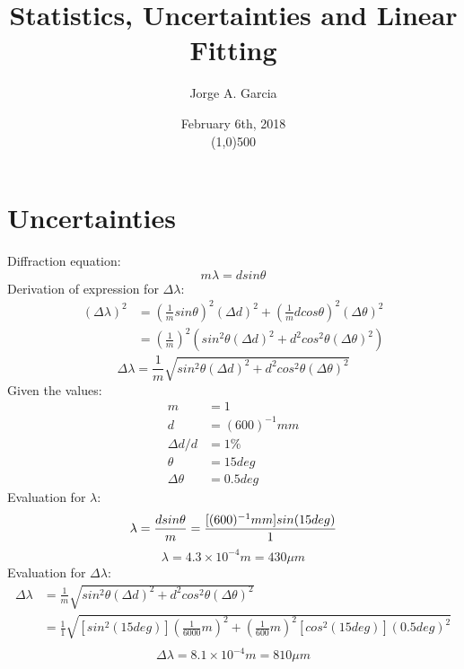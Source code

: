 \documentclass[twocolumn]{article}
\title{Statistics, Uncertainties and Linear Fitting}
\author{Jorge A. Garcia}
\date{February 6th, 2018\\\line(1,0){500}}
\begin{document}
 \maketitle
 
 \section{Uncertainties}
 
 Diffraction equation:
 \begin{equation*}
  m\lambda = dsin\theta
 \end{equation*}
 Derivation of expression for $\Delta\lambda$:
 \begin{align*}
  (\Delta\lambda)^2 &= (\frac{1}{m} sin\theta)^2 (\Delta d)^2 + (\frac{1}{m} dcos\theta)^2 (\Delta\theta)^2 \\
  &= (\frac{1}{m})^2 (sin^2\theta (\Delta d)^2 + d^2 cos^2\theta (\Delta\theta)^2)
 \end{align*}
 \begin{equation*}
  \boxed{\Delta\lambda = \frac{1}{m} \sqrt{ sin^2\theta (\Delta d)^2 + d^2 cos^2\theta (\Delta\theta)^2 }}
 \end{equation*}
 Given the values:
 \begin{align*}
  m &= 1 \\
  d &= (600)^{-1} mm \\
  \Delta d/d &= 1\% \\
  \theta &= 15 deg \\
  \Delta\theta &= 0.5 deg
 \end{align*}
 Evaluation for $\lambda$:
 \begin{equation*}
  \lambda = \frac{dsin\theta}{m} = \frac{ [(600)^{-1} mm] sin (15 deg)}{1} \\
 \end{equation*}
  \begin{equation*}
  \boxed{\lambda = 4.3 \times 10^{-4} m = 430 \mu m}
 \end{equation*}
 Evaluation for $\Delta\lambda$:
 \begin{align*}
  \Delta\lambda &= \frac{1}{m} \sqrt{ sin^2\theta (\Delta d)^2 + d^2 cos^2\theta (\Delta\theta)^2} \\
  &= \frac{1}{1} \sqrt{ [sin^2(15 deg)] (\frac{1}{6000}m)^2 + (\frac{1}{600}m)^2 [cos^2(15 deg)] (0.5 deg)^2} \\
 \end{align*}
 \begin{equation*}
  \boxed{\Delta\lambda = 8.1 \times 10^{-4} m = 810 \mu m}
 \end{equation*}
 \vfill\eject %
\end{document}
